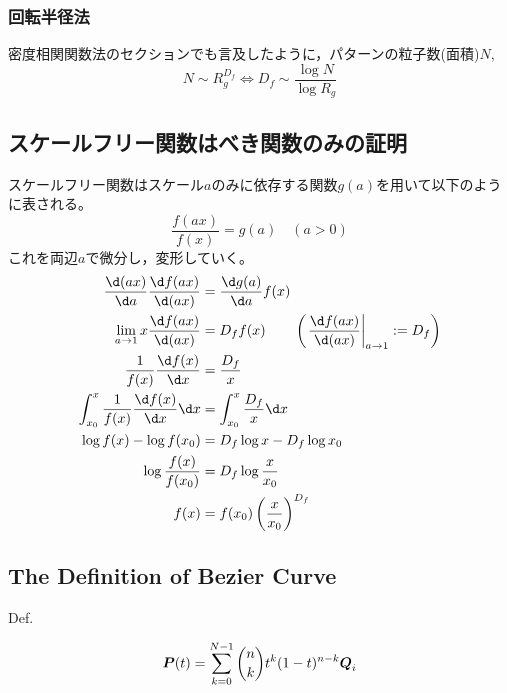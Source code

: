 \documentclass{ltjsarticle}
\begin{document}
\subsubsection{回転半径法}
密度相関関数法のセクションでも言及したように，パターンの粒子数(面積)$N$,
\begin{equation}
  N\sim R_g^{D_f} \Leftrightarrow D_f\sim\frac{\log N}{\log R_g}
\end{equation}
\subsection{スケールフリー関数はべき関数のみの証明}
スケールフリー関数はスケール$a$のみに依存する関数$g(a)$を用いて以下のように表される。
\begin{equation}
  \frac{f(ax)}{f(x)}=g(a) \quad (a>0)
\end{equation}
これを両辺$a$で微分し，変形していく。
\begin{equation}
  \begin{split}
    \frac{\d (ax)}{\d a}\frac{\d f(ax)}{\d (ax)}          & =\frac{\d g(a)}{\d a}f(x)                                                       \\
    \lim_{a\to 1}x\frac{\d f(ax)}{\d (ax)}                & =D_f f(x) \qquad\left(\left.\frac{\d f(ax)}{\d (ax)}\right|_{a\to1}:=D_f\right) \\
    \frac{1}{f(x)}\frac{\d f(x)}{\d x}                    & =\frac{D_f}{x}                                                                  \\
    \int_{x_0}^{x} \frac{1}{f(x)}\frac{\d f(x)}{\d x}\d x & =\int_{x_0}^{x} \frac{D_f}{x}\d x                                               \\
    \log f(x)-\log f(x_0)                                 & =D_f\log x-D_f\log x_0                                                          \\
    \log \frac{f(x)}{f(x_0)}                              & =D_f\log \frac{x}{x_0}                                                          \\
    f(x)                                                  & =f(x_0)\left(\frac{x}{x_0}\right)^{D_f}
  \end{split}
\end{equation}
\subsection{The Definition of Bezier Curve}
Def.

\begin{equation}
  \vb*{P}(t)=\sum_{k=0}^{N-1}\binom{n}{k}t^k(1-t)^{n-k}\vb*{Q}_i
\end{equation}
\end{document}
